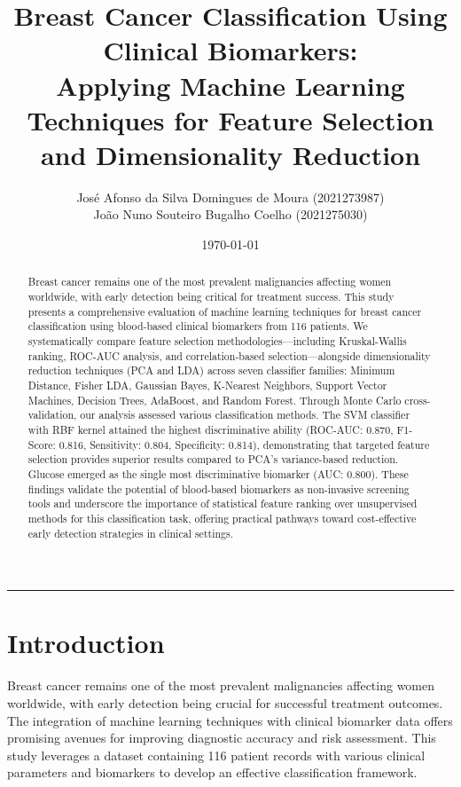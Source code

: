 \documentclass[12pt,a4paper]{article}
\title{Breast Cancer Classification Using Clinical Biomarkers: \\ Applying Machine Learning Techniques for Feature Selection and Dimensionality Reduction}
\author{José Afonso da Silva Domingues de Moura (2021273987)\\
João Nuno Souteiro Bugalho Coelho	 (2021275030)}
\date{\today}
\begin{document}
\justifying

\maketitle

\newpage
\tableofcontents
\vspace{1em}
\hrule
\vspace{1em}
\newpage

\begin{abstract}
Breast cancer remains one of the most prevalent malignancies affecting women worldwide, with early detection being critical for treatment success. This study presents a comprehensive evaluation of machine learning techniques for breast cancer classification using blood-based clinical biomarkers from 116 patients. We systematically compare feature selection methodologies—including Kruskal-Wallis ranking, ROC-AUC analysis, and correlation-based selection—alongside dimensionality reduction techniques (PCA and LDA) across seven classifier families: Minimum Distance, Fisher LDA, Gaussian Bayes, K-Nearest Neighbors, Support Vector Machines, Decision Trees, AdaBoost, and Random Forest. Through Monte Carlo cross-validation, our analysis assessed various classification methods. The SVM classifier with RBF kernel attained the highest discriminative ability (ROC-AUC: 0.870, F1-Score: 0.816, Sensitivity: 0.804, Specificity: 0.814), demonstrating that targeted feature selection provides superior results compared to PCA's variance-based reduction. Glucose emerged as the single most discriminative biomarker (AUC: 0.800). These findings validate the potential of blood-based biomarkers as non-invasive screening tools and underscore the importance of statistical feature ranking over unsupervised methods for this classification task, offering practical pathways toward cost-effective early detection strategies in clinical settings.
\end{abstract}

\section{Introduction}
\label{sec:introduction}

Breast cancer remains one of the most prevalent malignancies affecting women worldwide, with early detection being crucial for successful treatment outcomes. The integration of machine learning techniques with clinical biomarker data offers promising avenues for improving diagnostic accuracy and risk assessment. This study leverages a dataset containing 116 patient records with various clinical parameters and biomarkers to develop an effective classification framework.
\end{document}
